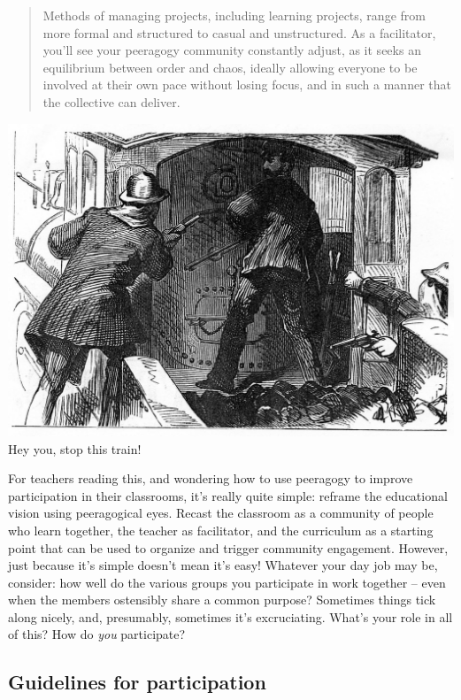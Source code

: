\begin{quote}
Methods of managing projects, including learning projects, range from
more formal and structured to casual and unstructured. As a facilitator,
you'll see your peeragogy community constantly adjust, as it seeks an
equilibrium between order and chaos, ideally allowing everyone to be
involved at their own pace without losing focus, and in such a manner
that the collective can deliver.
\end{quote}

\begin{center}
\includegraphics[width=.9\textwidth]{../pictures/james-gang.jpg} \\
Hey you, stop this train!
\end{center}

For teachers reading this, and wondering how to use peeragogy to improve
participation in their classrooms, it's really quite simple: reframe the
educational vision using peeragogical eyes. Recast the classroom as a
community of people who learn together, the teacher as facilitator, and
the curriculum as a starting point that can be used to organize and
trigger community engagement. However, just because it's simple doesn't
mean it's easy! Whatever your day job may be, consider: how well do the
various groups you participate in work together -- even when the members
ostensibly share a common purpose? Sometimes things tick along nicely,
and, presumably, sometimes it's excruciating. What's your role in all of
this? How do \emph{you} participate?



\subsection{Guidelines for participation}

